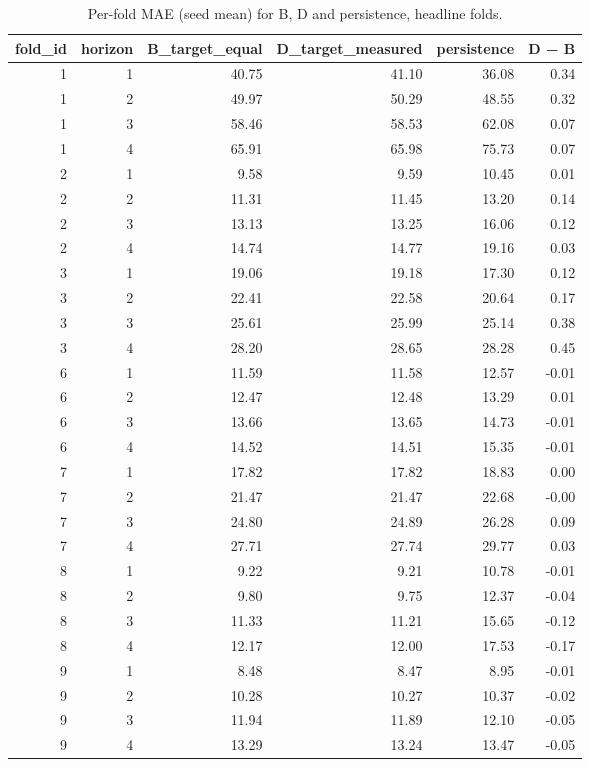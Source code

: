 \begin{table}[t]
\centering
\small
\caption{Per-fold MAE (seed mean) for B, D and persistence, headline folds.}
\label{tab:per-fold-B-D}
\begin{tabular}{rrrrrr}
\toprule
fold\_id & horizon & B\_target\_equal & D\_target\_measured & persistence & D − B \\
\midrule
1 & 1 & 40.75 & 41.10 & 36.08 & 0.34 \\
1 & 2 & 49.97 & 50.29 & 48.55 & 0.32 \\
1 & 3 & 58.46 & 58.53 & 62.08 & 0.07 \\
1 & 4 & 65.91 & 65.98 & 75.73 & 0.07 \\
2 & 1 & 9.58 & 9.59 & 10.45 & 0.01 \\
2 & 2 & 11.31 & 11.45 & 13.20 & 0.14 \\
2 & 3 & 13.13 & 13.25 & 16.06 & 0.12 \\
2 & 4 & 14.74 & 14.77 & 19.16 & 0.03 \\
3 & 1 & 19.06 & 19.18 & 17.30 & 0.12 \\
3 & 2 & 22.41 & 22.58 & 20.64 & 0.17 \\
3 & 3 & 25.61 & 25.99 & 25.14 & 0.38 \\
3 & 4 & 28.20 & 28.65 & 28.28 & 0.45 \\
6 & 1 & 11.59 & 11.58 & 12.57 & -0.01 \\
6 & 2 & 12.47 & 12.48 & 13.29 & 0.01 \\
6 & 3 & 13.66 & 13.65 & 14.73 & -0.01 \\
6 & 4 & 14.52 & 14.51 & 15.35 & -0.01 \\
7 & 1 & 17.82 & 17.82 & 18.83 & 0.00 \\
7 & 2 & 21.47 & 21.47 & 22.68 & -0.00 \\
7 & 3 & 24.80 & 24.89 & 26.28 & 0.09 \\
7 & 4 & 27.71 & 27.74 & 29.77 & 0.03 \\
8 & 1 & 9.22 & 9.21 & 10.78 & -0.01 \\
8 & 2 & 9.80 & 9.75 & 12.37 & -0.04 \\
8 & 3 & 11.33 & 11.21 & 15.65 & -0.12 \\
8 & 4 & 12.17 & 12.00 & 17.53 & -0.17 \\
9 & 1 & 8.48 & 8.47 & 8.95 & -0.01 \\
9 & 2 & 10.28 & 10.27 & 10.37 & -0.02 \\
9 & 3 & 11.94 & 11.89 & 12.10 & -0.05 \\
9 & 4 & 13.29 & 13.24 & 13.47 & -0.05 \\
\bottomrule
\end{tabular}
\end{table}
